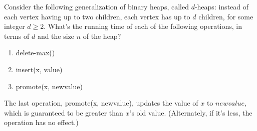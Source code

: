 \documentclass[11pt,letterpaper]{article}
\begin{document}
\begin{solution}
        
        


            
        



        
\end{solution}

\pagebreak
\begin{problem} 
    Consider the following generalization of binary heaps, called $d$-heaps: instead of each vertex having up to two children, each vertex has up to $d$ children, for some integer $d \ge 2$. What's the running time of each of the following operations, in terms of $d$ and the size $n$ of the heap?
    \begin{enumerate}
        \item delete-max()
        \item insert(x, value)
        \item promote(x, newvalue)
    \end{enumerate}
    The last operation, promote(x, newvalue), updates the value of $x$ to $newvalue$, which is guaranteed to be greater than $x$'s old value. (Alternately, if it's less, the operation has no effect.)
\end{problem}
\end{document}
